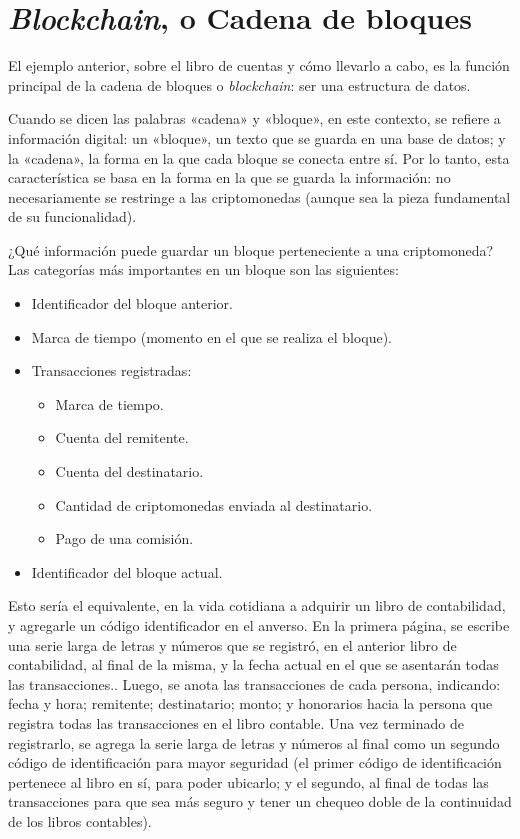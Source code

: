 \documentclass[12pt,a4paper,twoside]{book}
\begin{document}
\section{\textit{Blockchain}, o Cadena de bloques}
El ejemplo anterior, sobre el libro de cuentas y cómo llevarlo a cabo, es la función principal de la cadena de bloques o \textit{blockchain}: ser una estructura de datos.

Cuando se dicen las palabras «cadena» y «bloque», en este contexto, se refiere a información digital: un «bloque», un texto que se guarda en una base de datos; y la «cadena», la forma en la que cada bloque se conecta entre sí. Por lo tanto, esta característica se basa en la forma en la que se guarda la información: no necesariamente se restringe a las criptomonedas (aunque sea la pieza fundamental de su funcionalidad).

¿Qué información puede guardar un bloque perteneciente a una criptomoneda? Las categorías más importantes en un bloque son las siguientes:

\begin{itemize}
\item Identificador del bloque anterior.
\item Marca de tiempo (momento en el que se realiza el bloque).
\item Transacciones registradas:
	\begin{itemize}
	\item Marca de tiempo.
	\item Cuenta del remitente.
	\item Cuenta del destinatario.
	\item Cantidad de criptomonedas enviada al destinatario.
	\item Pago de una comisión.
	\end{itemize}
\item Identificador del bloque actual.
\end{itemize}

Esto sería el equivalente, en la vida cotidiana a adquirir un libro de contabilidad, y agregarle un código identificador en el anverso. En la primera página, se escribe una serie larga de letras y números que se registró, en el anterior libro de contabilidad, al final de la misma, y la fecha actual en el que se asentarán todas las transacciones.. Luego, se anota las transacciones de cada persona, indicando: fecha y hora; remitente; destinatario; monto; y honorarios hacia la persona que registra todas las transacciones en el libro contable. Una vez terminado de registrarlo, se agrega la serie larga de letras y números al final como un segundo código de identificación para mayor seguridad (el primer código de identificación pertenece al libro en sí, para poder ubicarlo; y el segundo, al final de todas las transacciones para que sea más seguro y tener un chequeo doble de la continuidad de los libros contables).
\end{document}
